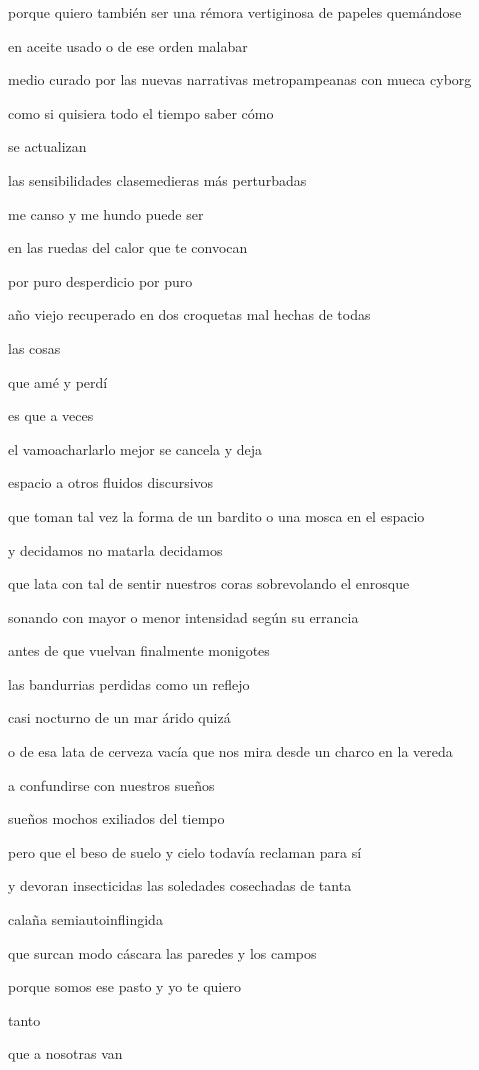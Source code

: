 \documentclass[
]{book}
\begin{document}
porque quiero también ser una rémora vertiginosa de papeles quemándose

en aceite usado o de ese orden malabar

medio curado por las nuevas narrativas metropampeanas con mueca cyborg

como si quisiera todo el tiempo saber cómo

se actualizan

las sensibilidades clasemedieras más perturbadas

me canso y me hundo puede ser

en las ruedas del calor que te convocan

por puro desperdicio por puro

año viejo recuperado en dos croquetas mal hechas de todas

las cosas

que amé y perdí

es que a veces

el vamoacharlarlo mejor se cancela y deja

espacio a otros fluidos discursivos

que toman tal vez la forma de un bardito o una mosca en el espacio

y decidamos no matarla decidamos

que lata con tal de sentir nuestros coras sobrevolando el enrosque

sonando con mayor o menor intensidad según su errancia

antes de que vuelvan finalmente monigotes

las bandurrias perdidas como un reflejo

casi nocturno de un mar árido quizá

o de esa lata de cerveza vacía que nos mira desde un charco en la vereda

a confundirse con nuestros sueños

sueños mochos exiliados del tiempo

pero que el beso de suelo y cielo todavía reclaman para sí

y devoran insecticidas las soledades cosechadas de tanta

calaña semiautoinflingida

que surcan modo cáscara las paredes y los campos

porque somos ese pasto y yo te quiero

tanto

que a nosotras van
\end{document}
